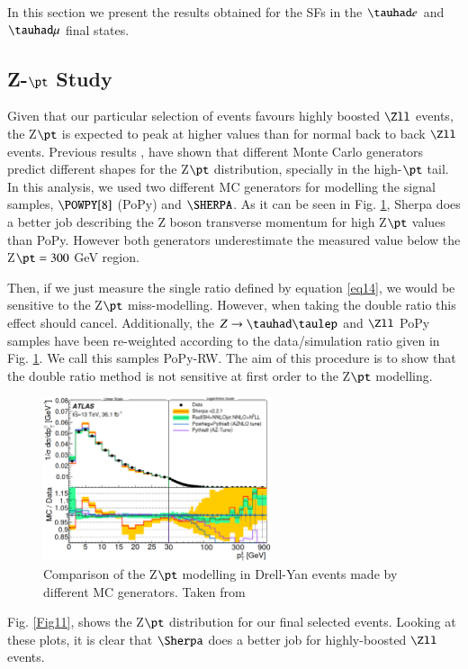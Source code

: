 In this section we present the results obtained for the SFs in the $\tauhad e$ and $\tauhad \mu$ final states. 
\subsection{Z-$\pt$ Study}
Given that our particular selection of events favours highly boosted $\Zll$ events, the Z$\pt$ is expected to peak at higher values than for normal back to back $\Zll$ events. Previous results \cite{Aad:2019wmn}, have shown that different Monte Carlo generators predict different shapes for the Z$\pt$ distribution, specially in the high-$\pt$ tail. In this analysis, we used two different MC generators for modelling the signal samples, $\POWPY[8]$ (PoPy) and $\SHERPA$. As it can be seen in Fig. \ref{Fig10}, Sherpa does a better job describing the Z boson transverse momentum for high Z$\pt$ values than PoPy. However both generators underestimate the measured value below the Z$\pt=300$ GeV region. 

Then, if we just measure the single ratio defined by equation \ref{eq14}, we would be sensitive to the Z$\pt$ miss-modelling. However, when taking the double ratio this effect should cancel. Additionally, the $Z\to\tauhad\taulep$ and $\Zll$ PoPy samples have been re-weighted according to the data/simulation ratio given in Fig. \ref{Fig10}. We call this samples PoPy-RW. The aim of this procedure is to show that the double ratio method is not sensitive at first order to the Z$\pt$ modelling.

\begin{figure}[htbp]
	\centering
	\includegraphics[width=0.6\textwidth]{figures/Fig10}
	\caption{Comparison of the Z$\pt$ modelling in Drell-Yan events made by different MC generators. Taken from \cite{Aad:2019wmn}}
	\label{Fig10}
\end{figure}

Fig. \ref{Fig11}, shows the Z$\pt$ distribution for our final selected events. Looking at these plots, it is clear that $\Sherpa$ does a better job for highly-boosted $\Zll$ events. 

